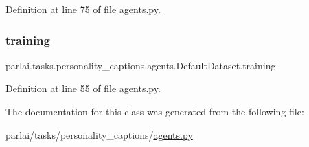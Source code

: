 Definition at line 75 of file agents.\+py.

\mbox{\label{classparlai_1_1tasks_1_1personality__captions_1_1agents_1_1DefaultDataset_a859342ffaf7f760cda952bc662cd7da3}} 
\subsubsection{\texorpdfstring{training}{training}}
{\footnotesize\ttfamily parlai.\+tasks.\+personality\+\_\+captions.\+agents.\+Default\+Dataset.\+training}



Definition at line 55 of file agents.\+py.



The documentation for this class was generated from the following file\+:\begin{DoxyCompactItemize}
\item 
parlai/tasks/personality\+\_\+captions/\hyperlink{parlai_2tasks_2personality__captions_2agents_8py}{agents.\+py}\end{DoxyCompactItemize}
